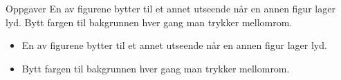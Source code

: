 \documentclass[a4paper]{article}
\begin{document}
\begin{large}
Oppgaver
En av figurene bytter til et annet utseende når en annen figur lager lyd.
Bytt fargen til bakgrunnen hver gang man trykker mellomrom.

\begin{itemize}
    \item En av figurene bytter til et annet utseende når en annen figur lager lyd.
    \item Bytt fargen til bakgrunnen hver gang man trykker mellomrom.
\end{itemize}

\end{large}
\end{document}
